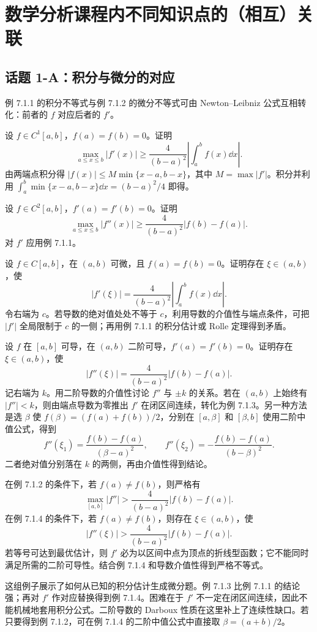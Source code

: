\section{数学分析课程内不同知识点的（相互）关联}
\subsection*{话题 1-A：积分与微分的对应}
例 7.1.1 的积分不等式与例 7.1.2 的微分不等式可由 Newton--Leibniz 公式互相转化：前者的 $f$ 对应后者的 $f'$。

设 $f\in C^1[a,b]$，$f(a)=f(b)=0$。证明
\[\max_{a\le x\le b}|f'(x)|\ge \frac{4}{(b-a)^2}\left|\int_a^b f(x)\dd x\right|.\]
\pf 由两端点积分得 $|f(x)|\le M\min\{x-a,b-x\}$，其中 $M=\max|f'|$。积分并利用 $\int_a^b\min\{x-a,b-x\}\dd x=(b-a)^2/4$ 即得。

设 $f\in C^2[a,b]$，$f'(a)=f'(b)=0$。证明
\[\max_{a\le x\le b}|f''(x)|\ge\frac4{(b-a)^2}|f(b)-f(a)|.\]
\pf 对 $f'$ 应用例 7.1.1。

设 $f\in C[a,b]$，在 $(a,b)$ 可微，且 $f(a)=f(b)=0$。证明存在 $\xi\in(a,b)$，使
\[|f'(\xi)|=\frac4{(b-a)^2}\left|\int_a^b f(x)\dd x\right|.\]
\pf 令右端为 $c$。若导数的绝对值处处不等于 $c$，利用导数的介值性与端点条件，可把 $|f'|$ 全局限制于 $c$ 的一侧；再用例 7.1.1 的积分估计或 Rolle 定理得到矛盾。

设 $f$ 在 $[a,b]$ 可导，在 $(a,b)$ 二阶可导，$f'(a)=f'(b)=0$。证明存在 $\xi\in(a,b)$，使
\[|f''(\xi)|=\frac4{(b-a)^2}|f(b)-f(a)|.\]
\pf 记右端为 $k$。用二阶导数的介值性讨论 $f''$ 与 $\pm k$ 的关系。若在 $(a,b)$ 上始终有 $|f''|<k$，则由端点导数为零推出 $f'$ 在闭区间连续，转化为例 7.1.3。另一种方法是选 $\beta$ 使 $f(\beta)=(f(a)+f(b))/2$，分别在 $[a,\beta]$ 和 $[\beta,b]$ 使用二阶中值公式，得到
\[f''(\xi_1)=\frac{f(b)-f(a)}{(\beta-a)^2},\qquad f''(\xi_2)=-\frac{f(b)-f(a)}{(b-\beta)^2}.\]
二者绝对值分别落在 $k$ 的两侧，再由介值性得到结论。

在例 7.1.2 的条件下，若 $f(a)\ne f(b)$，则严格有
\[\max_{[a,b]}|f''|>\frac4{(b-a)^2}|f(b)-f(a)|.\]
在例 7.1.4 的条件下，若 $f(a)\ne f(b)$，则存在 $\xi\in(a,b)$，使
\[|f''(\xi)|>\frac4{(b-a)^2}|f(b)-f(a)|.\]
\pf 若等号可达到最优估计，则 $f'$ 必为以区间中点为顶点的折线型函数；它不能同时满足所需的二阶可导性。结合例 7.1.4 和导数介值性得到严格不等式。
\par 这组例子展示了如何从已知的积分估计生成微分题。例 7.1.3 比例 7.1.1 的结论强；再对 $f'$ 作对应替换得到例 7.1.4。困难在于 $f'$ 不一定在闭区间连续，因此不能机械地套用积分公式。二阶导数的 Darboux 性质在这里补上了连续性缺口。若只要得到例 7.1.2，可在例 7.1.4 的二阶中值公式中直接取 $\beta=(a+b)/2$。

